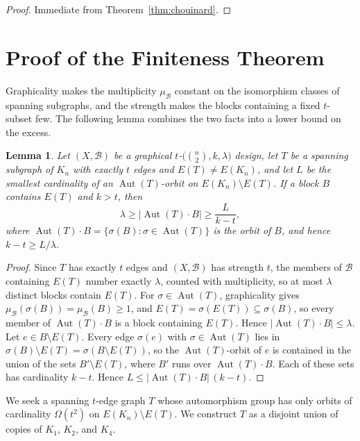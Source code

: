 \documentclass[12pt]{amsart}
\newtheorem{lemma}[theorem]{Lemma}
\theoremstyle{definition}
\DeclareMathOperator{\Aut}{Aut}
\newcommand{\cB}{\mathcal{B}}
\begin{document}
\begin{proof}
Immediate from Theorem~\ref{thm:chouinard}.
\end{proof}

\section{Proof of the Finiteness Theorem}
\label{sec:mainproof}

Graphicality makes the multiplicity $\mu_{\cB}$ constant on the isomorphism
classes of spanning subgraphs, and the strength makes the blocks containing
a fixed $t$-subset few. The following lemma combines the two facts into a
lower bound on the excess.

\begin{lemma}
\label{lem:km}
Let $(X, \cB)$ be a graphical $t$-$\bigl(\binom{n}{2}, k, \lambda\bigr)$
design, let $T$ be a spanning subgraph of $K_n$ with exactly $t$ edges and
$E(T) \neq E(K_n)$, and let $L$ be the smallest cardinality of an
$\Aut(T)$-orbit on $E(K_n) \setminus E(T)$. If a block $B$ contains $E(T)$
and $k > t$, then
\[
\lambda \geq |\Aut(T) \cdot B| \geq \frac{L}{k - t},
\]
where $\Aut(T) \cdot B = \{\sigma(B) : \sigma \in \Aut(T)\}$ is the orbit of
$B$, and hence $k - t \geq L/\lambda$.
\end{lemma}

\begin{proof}
Since $T$ has exactly $t$ edges and $(X, \cB)$ has strength $t$, the members
of $\cB$ containing $E(T)$ number exactly $\lambda$, counted with
multiplicity, so at most $\lambda$ distinct blocks contain $E(T)$. For
$\sigma \in \Aut(T)$, graphicality gives $\mu_{\cB}(\sigma(B)) =
\mu_{\cB}(B) \geq 1$, and $E(T) = \sigma(E(T)) \subseteq \sigma(B)$, so
every member of $\Aut(T) \cdot B$ is a block containing $E(T)$. Hence
$|\Aut(T) \cdot B| \leq \lambda$. Let $e \in B \setminus E(T)$. Every edge
$\sigma(e)$ with $\sigma \in \Aut(T)$ lies in $\sigma(B) \setminus E(T) =
\sigma(B \setminus E(T))$, so the $\Aut(T)$-orbit of $e$ is contained in the
union of the sets $B' \setminus E(T)$, where $B'$ runs over $\Aut(T) \cdot
B$. Each of these sets has cardinality $k - t$. Hence $L \leq |\Aut(T) \cdot
B|\,(k - t)$.
\end{proof}

We seek a spanning $t$-edge graph $T$ whose automorphism group has only
orbits of cardinality $\Omega(t^2)$ on $E(K_n) \setminus E(T)$. We construct
$T$ as a disjoint union of copies of $K_1$, $K_2$, and $K_4$.
\end{document}
